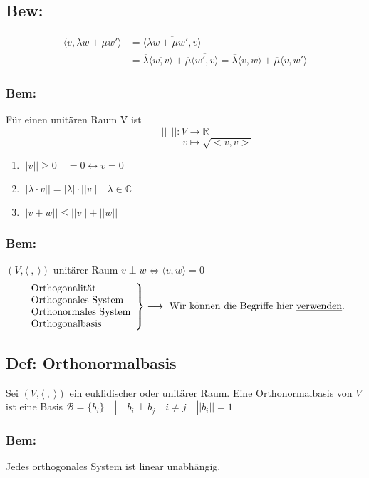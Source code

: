 \documentclass[titlepage,12pt,a4paper,ngerman]{report}
\newcommand{\tx}[1]{\textrm{#1}}
\begin{document}
\subsection{Bew:}
\begin{align*}
\langle v,\lambda w + \mu w'\rangle &= \langle \overline{\lambda w + \mu w', v} \rangle \\
&= \overline{\lambda} \langle \overline{w,v}\rangle + \overline{\mu}\langle \overline{w',v}\rangle  = \overline{\lambda}\langle v,w \rangle + \overline{\mu}\langle v,w'\rangle 
\end{align*}
\subsubsection{Bem:}
Für einen unitären Raum V ist
$$ || \ \ ||: V \to \mathbb{R}$$
$$ \qquad \qquad \qquad \ \ \, v \mapsto \sqrt{<v,v>}$$
\begin{enumerate}[1)]
	\item $ ||v|| \ge 0 \quad = 0 \leftrightarrow v = 0 $
	\item $ || \lambda \cdot v || = | \lambda| \cdot ||v|| \quad \lambda \in \mathbb{C} $
	\item $ ||v+w|| \le ||v|| + ||w|| $
\end{enumerate}

\subsubsection*{Bem:}
$(V, \langle\ ,\ \rangle)$ unitärer Raum $v \perp w \Leftrightarrow \langle v,w \rangle = 0$
$$\left. \begin{array}{l}
\tx{Orthogonalität} \\ \tx{Orthogonales System} \\ \tx{Orthonormales System} \\ \tx{Orthogonalbasis}
\end{array} \right  \} \longrightarrow \tx{ Wir können die Begriffe hier \underline{verwenden}.}$$
\subsection{Def: Orthonormalbasis}
Sei $ ( V, \langle\ ,\ \rangle)$ ein euklidischer oder unitärer Raum. Eine Orthonormalbasis von $V$ ist eine Basis $\mathcal B = \{b_i\}\quad | \quad b_i \perp b_j \quad i \neq j \quad ||b_i|| = 1$
\subsubsection*{Bem:} Jedes orthogonales System ist linear unabhängig.
\end{document}
